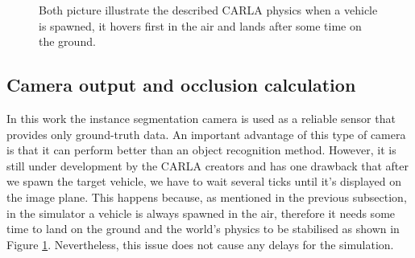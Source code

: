 \begin{figure} [h!]
  \centering
  \hfill
  \caption[Spawning a vehicle]{Both picture illustrate the described CARLA physics when a vehicle is spawned, it hovers first in the air and lands after some time on the ground.} \label{fig:spawn_vehicle}
\end{figure}

 \subsection{Camera output and occlusion calculation} \label{subsec:calc_occl}
 In this work the instance segmentation camera is used as a reliable sensor that provides only ground-truth data. An important advantage of this type of camera is that it can perform better than an object recognition method. However, it is still under development by the CARLA creators and has one drawback that after we spawn the target vehicle, we have to wait several ticks until it's displayed on the image plane. This happens because, as mentioned in the previous subsection, in the simulator a vehicle is always spawned in the air, therefore it needs some time to land on the ground and the world's physics to be stabilised as shown in Figure \ref{fig:spawn_vehicle}. Nevertheless, this issue does not cause any delays for the simulation.
 
